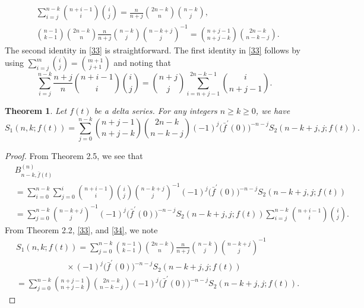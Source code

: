 \documentclass[a4paper,11pt]{amsart}
\newtheorem{theorem}{Theorem}[section]
\begin{document}
\begin{equation} \label{33}
\begin{aligned}
&\sum_{i=j}^{n-k}\binom{n+i-1}{i}\binom{i}{j}=\frac{n}{n+j}\binom{2n-k}{n}\binom{n-k}{j}, \\
&\binom{n-1}{k-1}\binom{2n-k}{n}\frac{n}{n+j}\binom{n-k}{j}\binom{n-k+j}{j}^{-1}=\binom{n+j-1}{n+j-k}\binom{2n-k}{n-k-j}.
\end{aligned}
\end{equation}
The second identity in \eqref{33} is straightforward. The first identity in \eqref{33} follows by using $\sum_{i=j}^{m}\binom{i}{j}=\binom{m+1}{j+1}$ and noting that
\begin{equation*}
\sum_{i=j}^{n-k}\frac{n+j}{n}\binom{n+i-1}{i}\binom{i}{j}=\binom{n+j}{j}\sum_{i=n+j-1}^{2n-k-1}\binom{i}{n+j-1}.
\end{equation*}
\begin{theorem}
Let $f(t)$ be a delta series. For any integers $n \ge k \ge 0$, we have
\begin{equation*}
S_{1}(n,k; f(t))=\sum_{j=0}^{n-k}\binom{n+j-1}{n+j-k}\binom{2n-k}{n-k-j}(-1)^{j}\big(\bar{f}^{\prime}(0)\big)^{-n-j}S_{2}(n-k+j,j; f(t)).
\end{equation*}
\end{theorem}
\begin{proof}
From Theorem 2.5, we see that 
\begin{equation} \label{34}
\begin{aligned}
&B_{n-k,\bar{f}(t)}^{(n)}\\
&=\sum_{i=0}^{n-k}\sum_{j=0}^{i}\binom{n+i-1}{i}\binom{i}{j}\binom{n-k+j}{j}^{-1}(-1)^{j}\big(\bar{f}^{\prime}(0)\big)^{-n-j}S_{2}(n-k+j,j; f(t)) \\
&=\sum_{j=0}^{n-k}\binom{n-k+j}{j}^{-1}(-1)^{j}\big(\bar{f}^{\prime}(0)\big)^{-n-j}S_{2}(n-k+j,j; f(t))\sum_{i=j}^{n-k}\binom{n+i-1}{i}\binom{i}{j}.
\end{aligned}
\end{equation}
From Theorem 2.2, \eqref{33}, and \eqref{34}, we note
\begin{align*}
&S_{1}(n,k; f(t))=\sum_{j=0}^{n-k}\binom{n-1}{k-1}\binom{2n-k}{n}\frac{n}{n+j}\binom{n-k}{j}\binom{n-k+j}{j}^{-1}\\
&\quad\quad\quad\quad\quad\quad \times (-1)^{j}\big(\bar{f}^{\prime}(0)\big)^{-n-j}S_{2}(n-k+j,j; f(t)) \\
&=\sum_{j=0}^{n-k} \binom{n+j-1}{n+j-k}\binom{2n-k}{n-k-j}(-1)^{j}\big(\bar{f}^{\prime}(0)\big)^{-n-j}S_{2}(n-k+j,j; f(t)).
\end{align*}
\end{proof}
\end{document}
